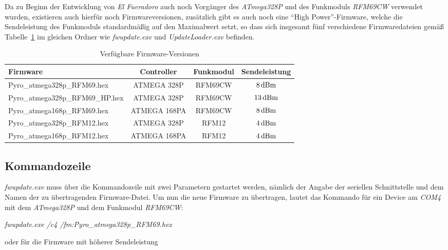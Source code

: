 \documentclass[pdftex, parskip, numbers=noenddot, toc=listof]{scrbook}
\newcommand{\anlage}{\emph{El Fueradoro}}
\begin{document}
	 Da zu Beginn der Entwicklung von {\anlage} auch noch Vorgänger des \emph{ATmega328P} und des Funkmoduls \emph{RFM69CW} verwendet wurden, existieren auch hierfür noch Firmwareversionen, zusätzlich gibt es auch noch eine \enquote{High Power}-Firmware, welche die Sendeleistung des Funkmoduls standardmäßig auf den Maximalwert setzt, so dass sich insgesamt fünf verschiedene Firmwaredateien gemäß Tabelle~\ref{tab:firmwareversions} im gleichen Ordner wie \emph{fwupdate.exe} und \emph{UpdateLoader.exe} befinden.

	\begin{table}
		\centering
		\begin{tabularx}{.925\textwidth}{Xccc}
			\hline\hline
			Firmware                        & Controller   & Funkmodul & Sendeleistung    \\ \hline
			Pyro\_atmega328p\_RFM69.hex     & ATMEGA 328P  & RFM69CW   & $\unit[8]{dBm}$  \\
			Pyro\_atmega328p\_RFM69\_HP.hex & ATMEGA 328P  & RFM69CW   & $\unit[13]{dBm}$ \\
			Pyro\_atmega168p\_RFM69.hex     & ATMEGA 168PA & RFM69CW   & $\unit[8]{dBm}$  \\
			Pyro\_atmega328p\_RFM12.hex     & ATMEGA 328P  & RFM12     & $\unit[4]{dBm}$  \\
			Pyro\_atmega168p\_RFM12.hex     & ATMEGA 168PA & RFM12     & $\unit[4]{dBm}$  \\ \hline\hline
		\end{tabularx}
		\caption{Verfügbare Firmware-Versionen}
		\label{tab:firmwareversions}
	\end{table}

	\subsection{Kommandozeile}

	\emph{fwupdate.exe} muss über die Kommandozeile mit zwei Parametern gestartet werden, nämlich der Angabe der seriellen Schnittstelle und dem Namen der zu übertragenden Firmware-Datei. Um nun die neue Firmware zu übertragen, lautet das Kommando für ein Device am \emph{COM4} mit dem \emph{ATmega328P} und dem Funkmodul \emph{RFM69CW}:

	\begin{center}
		\emph{fwupdate.exe /c4 /fm:Pyro\_atmega328p\_RFM69.hex}
	\end{center}

	oder für die Firmware mit höherer Sendeleistung
\end{document}
